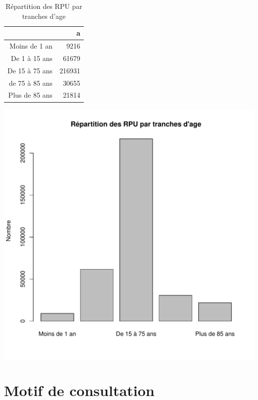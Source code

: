 \documentclass[12pt,english,french,twoside]{book}\usepackage[]{graphicx}\usepackage[]{color}
\makeatletter
\def\maxwidth{ %
  \ifdim\Gin@nat@width>\linewidth
    \linewidth
  \else
    \Gin@nat@width
  \fi
}
\makeatother
\begin{document}

\begin{table}[ht]
\centering
\begin{tabular}{rr}
  \hline
 & a \\ 
  \hline
Moins de 1 an & 9216 \\ 
  De 1 à 15 ans & 61679 \\ 
  De 15 à 75 ans & 216931 \\ 
  de 75 à 85 ans & 30655 \\ 
  Plus de 85 ans & 21814 \\ 
   \hline
\end{tabular}
\caption[Répartition des RPU par tranches d'age]{Répartition des RPU par tranches d'age} 
\label{tab:tranche}
\end{table}

\includegraphics[width=\maxwidth]{figure/tranche} 




\newpage
\chapter{Motif de consultation}


\end{document}
